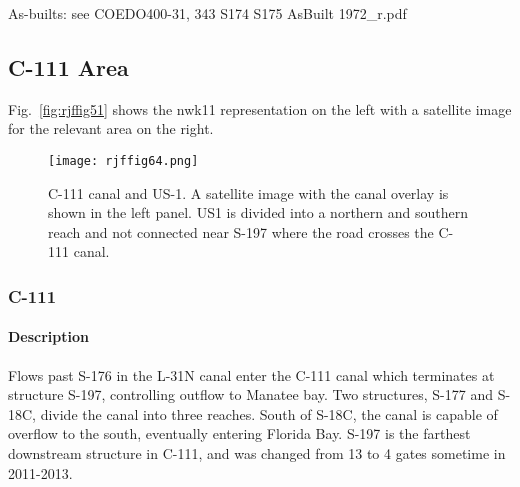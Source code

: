 \begin{notes}
As-builts: see COEDO400-31, 343 S174 S175 AsBuilt 1972\_r.pdf
\end{notes}

\clearpage






\subsection{C-111 Area}
Fig.~\ref{fig:rjffig51} shows the nwk11 representation on the left with a satellite image for the relevant area on the right.

\begin{figure}[!h]
  \begin{center}
  \texttt{[image: rjffig64.png]}
  \caption[C-111 canal and US-1.]{C-111 canal and US-1. A satellite image with the canal overlay is shown in the left panel. US1 is divided into a northern and southern reach and not connected near S-197 where the road crosses the C-111 canal.}
  \label{fig:rjffig64}
  \end{center}
\end{figure}

\clearpage

\subsubsection{C-111}
\paragraph{Description}
Flows past S-176 in the L-31N canal enter the C-111 canal which terminates at structure S-197, controlling outflow to Manatee bay.
Two structures, S-177 and S-18C, divide the canal into three reaches.
South of S-18C, the canal is capable of overflow to the south, eventually entering Florida Bay.
S-197 is the farthest downstream structure in C-111, and was changed from 13 to 4 gates sometime in 2011-2013.

